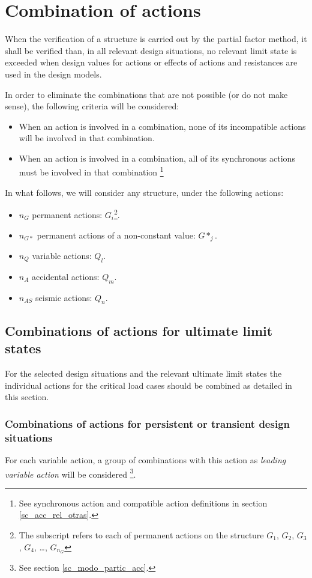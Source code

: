 \section{Combination of actions} \label{sc_comb}
When the verification of a structure is carried out by the partial factor method, it shall be verified than, in all relevant design situations, no relevant limit state is exceeded when design values for actions or effects of actions and resistances are used in the design models.

In order to eliminate the combinations that are not possible (or do not make sense), the following criteria will be considered:

\begin{itemize}
\item When an action is involved in a combination, none of its incompatible actions will be involved in that combination.
\item When an action is involved in a combination, all of its synchronous actions must be involved in that combination 
\footnote{See synchronous action and compatible action definitions in section \ref{sc_acc_rel_otras}.}
\end{itemize}
In what follows, we will consider any structure, under the following actions:
\begin{itemize}
\item $n_G$ permanent actions: $G_i$\footnote{The subscript refers to each of permanent actions on the structure $G_1$, $G_2$, $G_3$, $G_4$, \ldots, $G_{n_G}$ }.
\item $n_{G*}$ permanent actions of a non-constant value: $G*_j$.
\item $n_Q$ variable actions: $Q_l$.
\item $n_A$ accidental actions: $Q_m$.
\item $n_{AS}$ seismic actions: $Q_n$.
\end{itemize}


\subsection{Combinations of actions for ultimate limit states} \label{sc_comb_elu}
For the selected design situations and the relevant ultimate limit states the individual actions for the critical load cases should be combined as detailed in this section.

\subsubsection{Combinations of actions for persistent or transient design situations} \label{sc_comb_elu_spt}
For each variable action, a group of combinations with this action as \emph{leading variable action} will be considered \footnote{See section \ref{sc_modo_partic_acc}.}.

